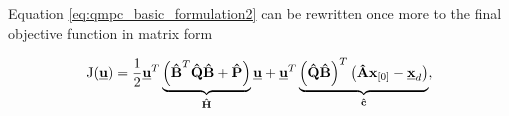 \documentclass{article}
\begin{document}
Equation \ref{eq:qmpc_basic_formulation2} can be rewritten once more to the final objective function in matrix form

\begin{equation}
\mathrm{J}(\underline{\textbf{u}}) = \frac{1}{2}\textbf{\underline{u}}^T\underbrace{\left(\textbf{\^B}^T\textbf{\^Q}\textbf{\^B} + \textbf{\^P}\right)}_{\textbf{\^H}}\textbf{\underline{u}} + \textbf{\underline{u}}^T\underbrace{\left(\textbf{\^Q}\textbf{\^B}\right)^T\left(\textbf{\^A}\textbf{x}_{[0]} - \textbf{\underline{x}}_d\right)}_{\textbf{\^c}},
\label{eq:mpc_objective_large}
\end{equation}
\end{document}
